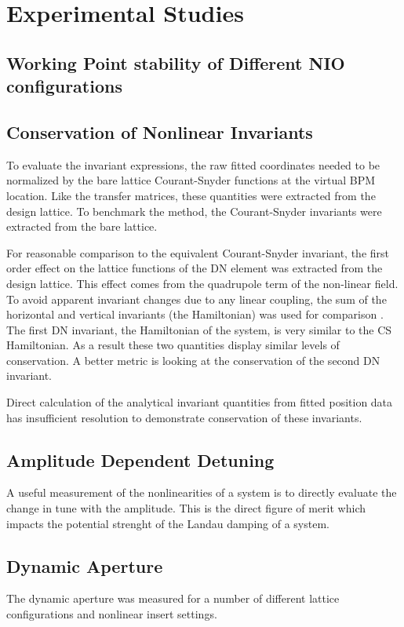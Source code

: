 \chapter{Experimental Studies} \label{chap:expResults}

\section{Working Point stability of Different NIO configurations} \label{sec:nioWorkPoint}

\section{Conservation of Nonlinear Invariants} \label{sec:invConv}
To evaluate the invariant expressions, the raw fitted coordinates needed to be normalized by the bare lattice Courant-Snyder functions at the virtual BPM location. Like the transfer matrices, these quantities were extracted from the design lattice. To benchmark the method, the Courant-Snyder invariants were extracted from the bare lattice.

For reasonable comparison to the equivalent Courant-Snyder invariant, the first order effect on the lattice functions of the DN element was extracted from the design lattice. This effect comes from the quadrupole term of the non-linear field. To avoid apparent invariant changes due to any linear coupling, the sum of the horizontal and vertical invariants (the Hamiltonian) was used for comparison \cite{leeAccelerator}. The first DN invariant, the Hamiltonian of the system, is very similar to the CS Hamiltonian. As a result these two quantities display similar levels of conservation. A better metric is looking at the conservation of the second DN invariant.

Direct calculation of the analytical invariant quantities from fitted position data has insufficient resolution to demonstrate conservation of these invariants.

\section{Amplitude Dependent Detuning} \label{sec:ampDetune}
A useful measurement of the nonlinearities of a system is to directly evaluate the change in tune with the amplitude. This is the direct figure of merit which impacts the potential strenght of the Landau damping of a system.

\section{Dynamic Aperture} \label{sec:DA}
The dynamic aperture was measured for a number of different lattice configurations and nonlinear insert settings.

